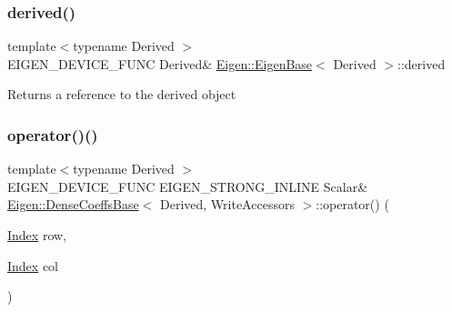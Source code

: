 \subsubsection{\texorpdfstring{derived()}{derived()}\hspace{0.1cm}{\footnotesize\ttfamily [2/2]}}
{\footnotesize\ttfamily template$<$typename Derived $>$ \\
E\+I\+G\+E\+N\+\_\+\+D\+E\+V\+I\+C\+E\+\_\+\+F\+U\+NC Derived\& \mbox{\hyperlink{struct_eigen_1_1_eigen_base}{Eigen\+::\+Eigen\+Base}}$<$ Derived $>$\+::derived\hspace{0.3cm}{\ttfamily [inline]}}

\begin{DoxyReturn}{Returns}
a reference to the derived object 
\end{DoxyReturn}
\mbox{\label{class_eigen_1_1_dense_coeffs_base_3_01_derived_00_01_write_accessors_01_4_ab0c40ee1944059a3e32a125cf794d547}} 
\subsubsection{\texorpdfstring{operator()()}{operator()()}\hspace{0.1cm}{\footnotesize\ttfamily [1/2]}}
{\footnotesize\ttfamily template$<$typename Derived $>$ \\
E\+I\+G\+E\+N\+\_\+\+D\+E\+V\+I\+C\+E\+\_\+\+F\+U\+NC E\+I\+G\+E\+N\+\_\+\+S\+T\+R\+O\+N\+G\+\_\+\+I\+N\+L\+I\+NE Scalar\& \mbox{\hyperlink{class_eigen_1_1_dense_coeffs_base}{Eigen\+::\+Dense\+Coeffs\+Base}}$<$ Derived, Write\+Accessors $>$\+::operator() (\begin{DoxyParamCaption}\item[{\mbox{\hyperlink{struct_eigen_1_1_eigen_base_a554f30542cc2316add4b1ea0a492ff02}{Index}}}]{row,  }\item[{\mbox{\hyperlink{struct_eigen_1_1_eigen_base_a554f30542cc2316add4b1ea0a492ff02}{Index}}}]{col }\end{DoxyParamCaption})\hspace{0.3cm}{\ttfamily [inline]}}

